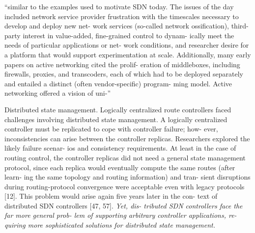 ``similar to the examples used to motivate SDN today. The issues of the day included network service provider frustration with the timescales necessary to develop and deploy new net- work services (so-called network ossification), third-party interest in value-added, fine-grained control to dynam- ically meet the needs of particular applications or net- work conditions, and researcher desire for a platform that would support experimentation at scale. Additionally, many early papers on active networking cited the prolif- eration of middleboxes, including firewalls, proxies, and transcoders, each of which had to be deployed separately and entailed a distinct (often vendor-specific) program- ming model. Active networking offered a vision of uni-''






Distributed state management. Logically centralized route controllers faced challenges involving distributed state management. A logically centralized controller must be replicated to cope with controller failure; how- ever, inconsistencies can arise between the controller replicas. Researchers explored the likely failure scenar- ios and consistency requirements. At least in the case of routing control, the controller replicas did not need a general state management protocol, since each replica would eventually compute the same routes (after learn- ing the same topology and routing information) and tran- sient disruptions during routing-protocol convergence were acceptable even with legacy protocols [12]. This problem would arise again five years later in the con- text of distributed SDN controllers [47, 57]. \emph{Yet, dis- tributed SDN controllers face the far more general prob- lem of supporting arbitrary controller applications, re- quiring more sophisticated solutions for distributed state management.}

